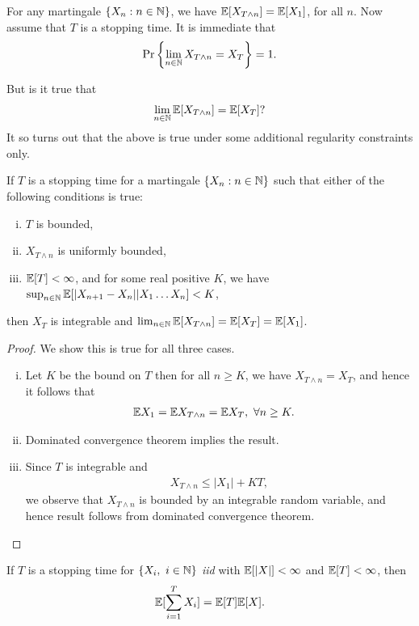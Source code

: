 \documentclass[a4paper,10pt,english]{article}
\begin{document}
\begin{rem}
For any martingale $\{X_n: n \in \mathbb{N}\}$, we have $\mathbb{E}[X_{T\wedge n}]=\mathbb{E}[X_1]$, for all $n$.  Now assume that $T$ is a stopping time. It is immediate that 
\begin{align*}
\Pr\left\{\lim_{n\in \mathbb{N}}{X}_{T\wedge n} = X_T\right\} = 1.
\end{align*}
\end{rem}
But  is it true that
\begin{align*}
\lim_{n \in \mathbb{N}}\mathbb{E}[X_{T\wedge n}] = \mathbb{E}[X_T]?
\end{align*}
It so turns out that the above is true under some additional regularity constraints only. %
\begin{thm}
\label{MartStopThm}
If $T$ is a stopping time for a martingale $\{X_n: n \in \mathbb{N}\}$ such that either of the following conditions is true:
\begin{enumerate}[(i)]
\item $T$ is bounded, 
\item $X_{T\wedge n}$ is uniformly bounded,
\item $\mathbb{E}[T] < \infty$, and for some real positive $K$, we have $\sup_{n \in \mathbb{N}}\mathbb{E}[|X_{n+1}-X_n||X_1 \hdots X_n] < K$,
\end{enumerate}
then $X_T$ is integrable and $\lim_{n \in \mathbb{N}}\mathbb{E}[X_{T\wedge n}] = \mathbb{E}[X_T]=\mathbb{E}[X_1]$.
\end{thm}
\begin{proof} We show this is true for all three cases.
\begin{enumerate}[(i)] 
\item Let $K$ be the bound on $T$ then for all $n \geq K$, we have $X_{T\wedge n} = X_T$, and hence it follows that
\begin{align*}
\mathbb{E} X_1 = \mathbb{E} X_{T\wedge n} &= \mathbb{E} X_T, ~\forall n \geq K.
\end{align*}
\item Dominated convergence theorem implies the result. 
\item Since $T$ is integrable and  
\begin{align*} 
X_{T\wedge n} \leq |X_1| + K T,
\end{align*}
we observe that $X_{T\wedge n}$ is bounded by an integrable random variable, and hence result follows from dominated convergence theorem.
\end{enumerate}
\end{proof}
\begin{cor} If $T$ is a stopping time for $\{X_i,~ i \in \mathbb{N}\}$ \textit{iid} with $\mathbb{E}[|X|]< \infty$ and $\mathbb{E}[T]< \infty$, then
\begin{align*}
\mathbb{E}[\sum_{i=1}^{T}X_i]=\mathbb{E}[T]\mathbb{E}[X].
\end{align*}
\end{cor}
\end{document}
